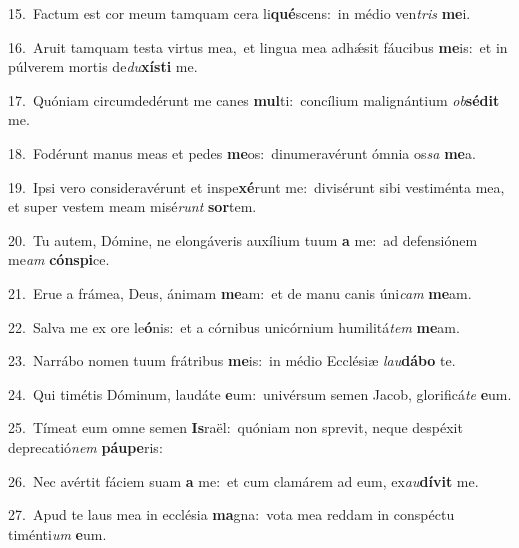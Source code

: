 {\numbfont\textcolor{\numbcolor}{15.}}~Factum est cor meum tamquam cera li\-\textbf{qué}\-scens:~\star in médio ven\textit{tris} \textbf{me}\-i.\par
{\numbfont\textcolor{\numbcolor}{16.}}~Aruit tamquam testa virtus mea,~\dagger et lingua mea adhǽsit fáucibus \textbf{me}\-is:~\star et in púlverem mortis de\-\textit{du}\-\textbf{xís}\textbf{ti} me.\par
{\numbfont\textcolor{\numbcolor}{17.}}~Quóniam circumdedérunt me canes \textbf{mul}\-ti:~\star concílium malignántium \textit{ob}\-\textbf{sé}\textbf{dit} me.\par
{\numbfont\textcolor{\numbcolor}{18.}}~Fodérunt manus meas et pedes \textbf{me}\-os:~\star dinumeravérunt ómnia os\textit{sa} \textbf{me}\-a.\par
{\numbfont\textcolor{\numbcolor}{19.}}~Ipsi vero consideravérunt et inspe\-\textbf{xé}\-runt me:~\star divisérunt sibi vestiménta mea, et super vestem meam misé\textit{runt} \textbf{sor}\-tem.\par
{\numbfont\textcolor{\numbcolor}{20.}}~Tu autem, Dómine, ne elongáveris auxílium tuum \textbf{a} me:~\star ad defensiónem me\textit{am} \textbf{cón}\-\textbf{spi}ce.\par
{\numbfont\textcolor{\numbcolor}{21.}}~Erue a frámea, Deus, ánimam \textbf{me}\-am:~\star et de manu canis úni\textit{cam} \textbf{me}\-am.\par
{\numbfont\textcolor{\numbcolor}{22.}}~Salva me ex ore le\-\textbf{ó}\-nis:~\star et a córnibus unicórnium humilitá\textit{tem} \textbf{me}\-am.\par
{\numbfont\textcolor{\numbcolor}{23.}}~Narrábo nomen tuum frátribus \textbf{me}\-is:~\star in médio Ecclésiæ \textit{lau}\-\textbf{dá}\textbf{bo} te.\par
{\numbfont\textcolor{\numbcolor}{24.}}~Qui timétis Dóminum, laudáte \textbf{e}\-um:~\star univérsum semen Jacob, glorificá\textit{te} \textbf{e}\-um.\par
{\numbfont\textcolor{\numbcolor}{25.}}~Tímeat eum omne semen \textbf{Is}\-raël:~\star quóniam non sprevit, neque despéxit deprecatió\textit{nem} \textbf{páu}\-\textbf{pe}ris:\par
{\numbfont\textcolor{\numbcolor}{26.}}~Nec avértit fáciem suam \textbf{a} me:~\star et cum clamárem ad eum, ex\-\textit{au}\-\textbf{dí}\textbf{vit} me.\par
{\numbfont\textcolor{\numbcolor}{27.}}~Apud te laus mea in ecclésia \textbf{ma}\-gna:~\star vota mea reddam in conspéctu timénti\textit{um} \textbf{e}\-um.\par
